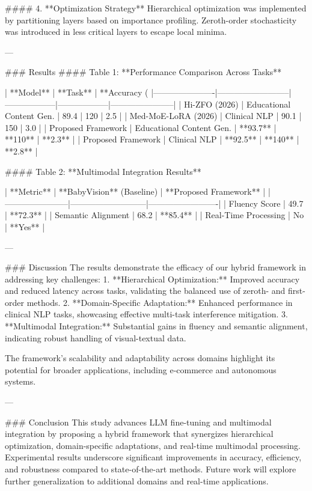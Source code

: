 #### 4. **Optimization Strategy**
Hierarchical optimization was implemented by partitioning layers based on importance profiling. Zeroth-order stochasticity was introduced in less critical layers to escape local minima.

---

### Results
#### Table 1: **Performance Comparison Across Tasks**

| **Model**           | **Task**                 | **Accuracy (%
|----------------------|--------------------------|------------------|------------------|-----------------------|
| Hi-ZFO (2026)        | Educational Content Gen. | 89.4             | 120              | 2.5                   |
| Med-MoE-LoRA (2026)  | Clinical NLP             | 90.1             | 150              | 3.0                   |
| Proposed Framework   | Educational Content Gen. | **93.7**         | **110**          | **2.3**               |
| Proposed Framework   | Clinical NLP             | **92.5**         | **140**          | **2.8**               |

#### Table 2: **Multimodal Integration Results**

| **Metric**           | **BabyVision** (Baseline) | **Proposed Framework** |
|-----------------------|---------------------------|-------------------------|
| Fluency Score         | 49.7                     | **72.3**               |
| Semantic Alignment    | 68.2                     | **85.4**               |
| Real-Time Processing  | No                       | **Yes**                |

---

### Discussion
The results demonstrate the efficacy of our hybrid framework in addressing key challenges:
1. **Hierarchical Optimization:** Improved accuracy and reduced latency across tasks, validating the balanced use of zeroth- and first-order methods.
2. **Domain-Specific Adaptation:** Enhanced performance in clinical NLP tasks, showcasing effective multi-task interference mitigation.
3. **Multimodal Integration:** Substantial gains in fluency and semantic alignment, indicating robust handling of visual-textual data.

The framework's scalability and adaptability across domains highlight its potential for broader applications, including e-commerce and autonomous systems.

---

### Conclusion
This study advances LLM fine-tuning and multimodal integration by proposing a hybrid framework that synergizes hierarchical optimization, domain-specific adaptations, and real-time multimodal processing. Experimental results underscore significant improvements in accuracy, efficiency, and robustness compared to state-of-the-art methods. Future work will explore further generalization to additional domains and real-time applications.

